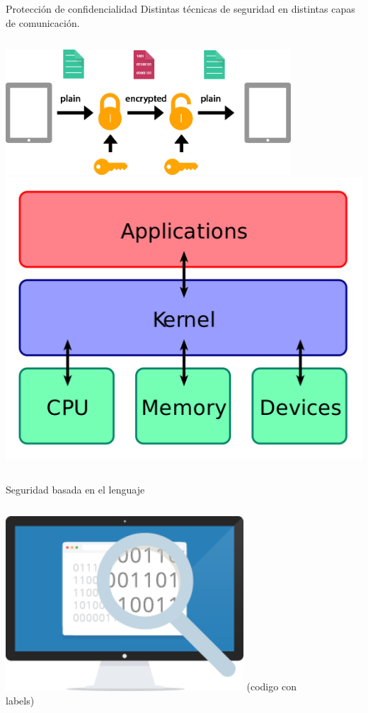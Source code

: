 \documentclass[aspectratio=169,10pt]{beamer}
\begin{document}
\begin{frame}[fragile]{Protección de confidencialidad}
  Distintas técnicas de seguridad en distintas capas de comunicación. \pause
  \vspace{0.5cm}
  \begin{columns}[T,onlytextwidth]
    \includegraphics[width=0.8\textwidth]{images/e2e.png} \pause
    \includegraphics[width=1.0\textwidth]{images/kernel.png}
  \end{columns}
\end{frame}

\begin{frame}[fragile]{Seguridad basada en el lenguaje}
	\begin{columns}[T,onlytextwidth]
		\includegraphics[width=0.8\textwidth]{images/lbs.png}
		(codigo con labels)
	\end{columns}
\end{frame}
\end{document}
